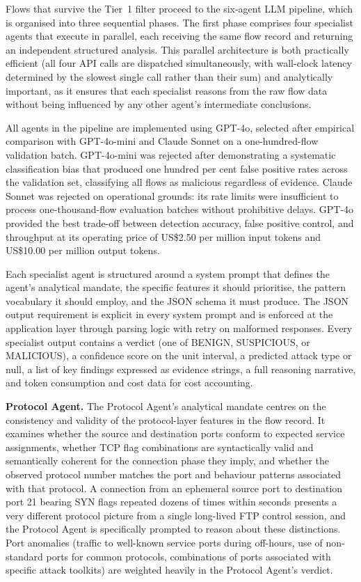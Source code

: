 Flows that survive the Tier~1 filter proceed to the six-agent LLM pipeline, which is organised into three sequential phases. The first phase comprises four specialist agents that execute in parallel, each receiving the same flow record and returning an independent structured analysis. This parallel architecture is both practically efficient (all four API calls are dispatched simultaneously, with wall-clock latency determined by the slowest single call rather than their sum) and analytically important, as it ensures that each specialist reasons from the raw flow data without being influenced by any other agent's intermediate conclusions.

All agents in the pipeline are implemented using GPT-4o, selected after empirical comparison with GPT-4o-mini and Claude Sonnet on a one-hundred-flow validation batch. GPT-4o-mini was rejected after demonstrating a systematic classification bias that produced one hundred per cent false positive rates across the validation set, classifying all flows as malicious regardless of evidence. Claude Sonnet was rejected on operational grounds: its rate limits were insufficient to process one-thousand-flow evaluation batches without prohibitive delays. GPT-4o provided the best trade-off between detection accuracy, false positive control, and throughput at its operating price of US\$2.50 per million input tokens and US\$10.00 per million output tokens.

Each specialist agent is structured around a system prompt that defines the agent's analytical mandate, the specific features it should prioritise, the pattern vocabulary it should employ, and the JSON schema it must produce. The JSON output requirement is explicit in every system prompt and is enforced at the application layer through parsing logic with retry on malformed responses. Every specialist output contains a verdict (one of BENIGN, SUSPICIOUS, or MALICIOUS), a confidence score on the unit interval, a predicted attack type or null, a list of key findings expressed as evidence strings, a full reasoning narrative, and token consumption and cost data for cost accounting.

\textbf{Protocol Agent.} The Protocol Agent's analytical mandate centres on the consistency and validity of the protocol-layer features in the flow record. It examines whether the source and destination ports conform to expected service assignments, whether TCP flag combinations are syntactically valid and semantically coherent for the connection phase they imply, and whether the observed protocol number matches the port and behaviour patterns associated with that protocol. A connection from an ephemeral source port to destination port 21 bearing SYN flags repeated dozens of times within seconds presents a very different protocol picture from a single long-lived FTP control session, and the Protocol Agent is specifically prompted to reason about these distinctions. Port anomalies (traffic to well-known service ports during off-hours, use of non-standard ports for common protocols, combinations of ports associated with specific attack toolkits) are weighted heavily in the Protocol Agent's verdict.

